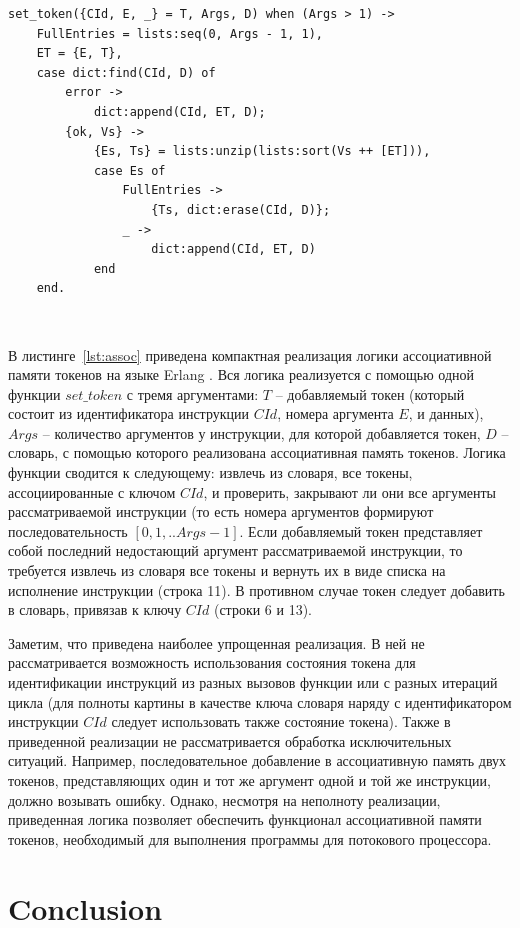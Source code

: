 \documentclass[
11pt,%
tightenlines,%
twoside,%
onecolumn,%
nofloats,%
nobibnotes,%
nofootinbib,%
superscriptaddress,%
noshowpacs,%
centertags]%
{revtex4}
\begin{document}
\begin{lstlisting}[caption={Реализация логики ассоциативной памяти токенов.},label={lst:assoc}]
set_token({CId, E, _} = T, Args, D) when (Args > 1) ->
	FullEntries = lists:seq(0, Args - 1, 1),
	ET = {E, T},
	case dict:find(CId, D) of
		error ->
			dict:append(CId, ET, D);
		{ok, Vs} ->
			{Es, Ts} = lists:unzip(lists:sort(Vs ++ [ET])),
			case Es of
				FullEntries ->
					{Ts, dict:erase(CId, D)};
				_ ->
					dict:append(CId, ET, D)
			end
	end.
\end{lstlisting}

\

В листинге~\ref{lst:assoc} приведена компактная реализация логики ассоциативной памяти токенов на языке Erlang \cite{Armstrong}.
Вся логика реализуется с помощью одной функции $set\_token$ с тремя аргументами: $T$ -- добавляемый токен (который состоит из идентификатора инструкции $CId$, номера аргумента $E$, и данных), $Args$ -- количество аргументов у инструкции, для которой добавляется токен, $D$ -- словарь, с помощью которого реализована ассоциативная память токенов.
Логика функции сводится к следующему: извлечь из словаря, все токены, ассоциированные с ключом $CId$, и проверить, закрывают ли они все аргументы рассматриваемой инструкции (то есть номера аргументов формируют последовательность $[0, 1, .. Args - 1]$.
Если добавляемый токен представляет собой последний недостающий аргумент рассматриваемой инструкции, то требуется извлечь из словаря все токены и вернуть их в виде списка на исполнение инструкции (строка 11).
В противном случае токен следует добавить в словарь, привязав к ключу $CId$ (строки 6 и 13).

Заметим, что приведена наиболее упрощенная реализация.
В ней не рассматривается возможность использования состояния токена для идентификации инструкций из разных вызовов функции или с разных итераций цикла (для полноты картины в качестве ключа словаря наряду с идентификатором инструкции $CId$ следует использовать также состояние токена).
Также в приведенной реализации не рассматривается обработка исключительных ситуаций.
Например, последовательное добавление в ассоциативную память двух токенов, представляющих один и тот же аргумент одной и той же инструкции, должно возывать ошибку.
Однако, несмотря на неполноту реализации, приведенная логика позволяет обеспечить функционал ассоциативной памяти токенов, необходимый для выполнения программы для потокового процессора.

\section{Conclusion}
\end{document}
